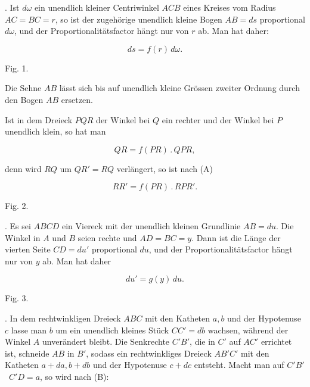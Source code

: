 \par{}%
. Ist $d\omega$ ein unendlich kleiner Centriwinkel $ACB$ eines Kreises vom Radius $AC=BC=r$, so ist der zugeh\"orige unendlich kleine Bogen $AB=ds$ proportional $d\omega$, und der Proportionalit\"atsfactor h\"angt nur von $r$ ab. Man hat daher:

\[
\tag*{(A)} ds = f(r)\,d\omega.
\]

\begin{center}\begin{minipage}{\linewidth}\centering


Fig. 1.
\end{minipage}\end{center}

\noindent Die Sehne $AB$ l\"asst sich bis auf unendlich kleine Gr\"ossen zweiter Ordnung durch den Bogen $AB$ ersetzen.

\noindent Ist in dem Dreieck $PQR$ der Winkel bei $Q$ ein rechter und der Winkel bei $P$ unendlich klein, so hat man

\[
\tag*{(A')} QR = f(PR)\,.\,QPR,
\]

\noindent denn wird $RQ$ um $QR' = RQ$ verl\"angert, so ist nach (A)

\[
RR' = f(PR)\,.\,RPR'.
\]

\begin{center}\begin{minipage}{\linewidth}\centering


Fig. 2.
\end{minipage}\end{center}

. Es sei $ABCD$ ein Viereck mit der unendlich kleinen Grundlinie $AB=du$. Die Winkel in $A$ und $B$ seien rechte und $AD=BC=y$. Dann ist die L\"ange der vierten Seite $CD=du'$ proportional $du$, und der Proportionalit\"atsfactor h\"angt nur von $y$ ab. Man hat daher

\[
\tag*{(B)} du' = g(y)\,du.
\]

\begin{center}\begin{minipage}{\linewidth}\centering


Fig. 3.
\end{minipage}\end{center}

. In dem rechtwinkligen Dreieck $ABC$ mit den Katheten $a,b$ und der Hypotenuse $c$ lasse man $b$ um ein unendlich kleines St\"uck $CC'=db$ wachsen, w\"ahrend der Winkel $A$ unver\"andert bleibt. Die Senkrechte $C'B'$, die in $C'$ auf $AC'$ errichtet ist, schneide $AB$ in $B'$, sodass ein rechtwinkliges Dreieck $AB'C'$ mit den Katheten $a+da, b+db$ und der Hypotenuse $c+dc$ entsteht. Macht man auf $C'B'$ \ $C'D=a$, so wird nach (B):

